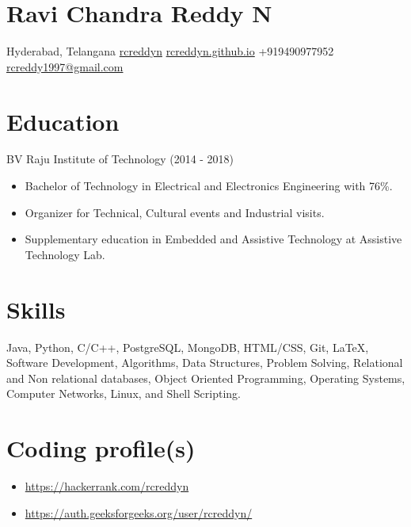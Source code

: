 \documentclass{article}
\begin{document}
\section*{\Huge Ravi Chandra Reddy N}

 {Hyderabad, Telangana}   \href{https://linkedin.com/in/rcreddyn}{rcreddyn}   \href{https://rcreddyn.github.io}{rcreddyn.github.io}   +919490977952    \href{mailto:rcreddy1997@gmail.com}{rcreddy1997@gmail.com}

\begin{multicols}{2}
\section*{Education}
 BV Raju Institute of Technology (2014 - 2018)
\begin{itemize}
\item \small Bachelor of Technology in Electrical and Electronics Engineering with 76\%.
\item \small Organizer for Technical, Cultural events and Industrial visits.
\item \small Supplementary education in Embedded and Assistive Technology  at Assistive Technology Lab.
\end{itemize}

\section*{Skills}
\begin{flushleft}
Java, Python, C/C++,
PostgreSQL, MongoDB, HTML/CSS,
Git, \LaTeX, Software Development, Algorithms, Data Structures, Problem Solving, Relational and Non relational databases, Object Oriented Programming, Operating Systems, Computer Networks, Linux, and Shell Scripting.
\end{flushleft}


\section*{Coding profile(s)}
\begin{itemize}
\item \url {https://hackerrank.com/rcreddyn}
\item \url {https://auth.geeksforgeeks.org/user/rcreddyn/}
\end{itemize}


\end{multicols}
\end{document}
